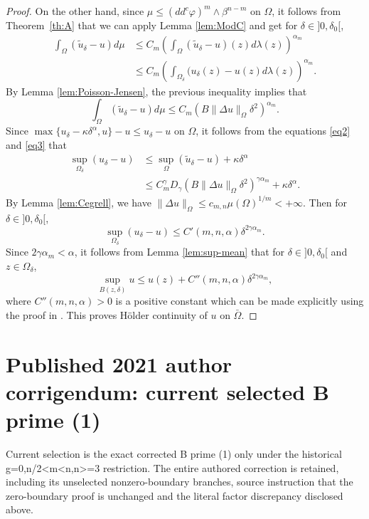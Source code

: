 \documentclass[11pt]{article}
\numberwithin{equation}{section}
\theoremstyle{definition}
\theoremstyle{plain}
\theoremstyle{definition}
\def\jepversionprefix{original}
\begin{document}
\begin{proof}
On the other hand, since $\mu\leq (dd^c\varphi)^m\wedge\beta^{n-m}$ on $\Omega$, it follows from Theorem~\ref{th:A} that we can apply Lemma \ref{lem:ModC} and get for $\delta\in{}]0,\delta_0[$,
\begin{align*}
\int_{\Omega}(\tilde{u}_{\delta}-u)d\mu & \leq C_m \left(\int_{\Omega}(\tilde{u}_{\delta}-u)(z)d\lambda(z)\right)^{\alpha_m} \nonumber \\
&\leq C_m\left(\int_{\Omega_{\delta}}({u}_{\delta}(z)-u(z)d\lambda(z)\right)^{\alpha_m}.
\end{align*}
By Lemma \ref{lem:Poisson-Jensen}, the previous inequality implies that
\begin{equation} \label{eq3}
\int_{\Omega}(\tilde{u}_{\delta}-u)d\mu \leq C_m(B \|\Delta u\|_{\Omega}\delta^2)^{\alpha_m}.
\end{equation}
Since $ \max \{{u}_{\delta}- \kappa \delta^{\alpha},u\}-u\leq {u}_{\delta}-u$ on $\Omega$, it follows from the equations \eqref{eq2} and \eqref{eq3} that
\begin{align*}
\sup_{\Omega_{\delta}}( {u}_{\delta}-u)&\leq\sup_{\Omega}(\tilde{u}_{\delta}-u)+ \kappa \delta^{\alpha} \\
&\leq C_m^{\gamma} D_\gamma \left(B\|\Delta u\|_{\Omega}\delta^2\right)^{\gamma\alpha_m} + \kappa \delta^{\alpha}.
\end{align*}
By Lemma \ref{lem:Cegrell}, we have $\|\Delta u\|_{\Omega} \leq c_{m,n} \mu (\Omega)^{1 \slash m} < + \infty$. Then for $\delta\in{}]0,\delta_0[$,
\[
\sup_{\Omega_{\delta}}({u}_{\delta}-u)\leq C' (m,n,\alpha) \delta^{2 \gamma \alpha_m}.
\]
Since $2 \gamma \alpha_m < \alpha$, it follows from Lemma \ref{lem:sup-mean} that for $\delta\in{}]0,\delta_0[$ and $z \in \Omega_\delta$,
\[
\sup_{B (z,\delta)} u \leq u (z) + C'' (m,n,\alpha) \delta^{2 \gamma \alpha_m},
\]
where $C''(m,n,\alpha) > 0$ is a positive constant which can be made explicitly using the proof in \cite{GKZ08}.
This proves Hölder continuity of $u$ on $\bar \Omega$.
\end{proof}


\clearpage
\def\jepversionprefix{corrigendum}
\setcounter{section}{0}\setcounter{equation}{0}\setcounter{theorem}{0}
\section*{Published 2021 author corrigendum: current selected B prime (1)}
\noindent Current selection is the exact corrected B prime (1) only under the historical g=0,n/2<m<n,n>=3 restriction. The entire authored correction is retained, including its unselected nonzero-boundary branches, source instruction that the zero-boundary proof is unchanged and the literal factor discrepancy disclosed above.\par\medskip
\end{document}
